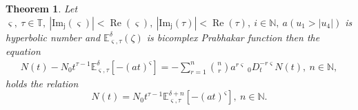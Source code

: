 \documentclass[a4paper,12pt]{article}
\newtheorem{theorem}{Theorem}[section]
\theoremstyle{remark}
\begin{document}
\begin{theorem}
	Let $ \varsigma ,~\tau\in \mathbb{T},~|\operatorname{Im_j}( \varsigma)|<\operatorname{Re}( \varsigma),~ |\operatorname{Im_j}(\tau)|<\operatorname{Re}(\tau),~i\in\mathbb{N}, ~a (u_{1}> |u_{4}|)$ is hyperbolic number  and $\mathbb{E}_{ \varsigma,\tau}^\delta(\zeta)$ is bicomplex Prabhakar function then the equation
	\begin{eqnarray}\label{ke-ml}
	N(t)-N_0 t^{\tau -1}\mathbb{E}_{ \varsigma,\tau}^\delta[-(a t)^{ \varsigma}]=-\sum_{r=1}^{n}\binom{n}{r} {a}^{r \varsigma}~  _0D^{-r \varsigma}_t N(t),~n\in \mathbb{N},
	\end{eqnarray}
	holds the relation
	\begin{equation}\label{eq:app}
	N(t) = N_0t^{\tau -1}\mathbb{E}_{ \varsigma,\tau}^{\delta+n}[-(a t)^{ \varsigma}],~n\in \mathbb{N}.
	\end{equation}
\end{theorem}
\end{document}
